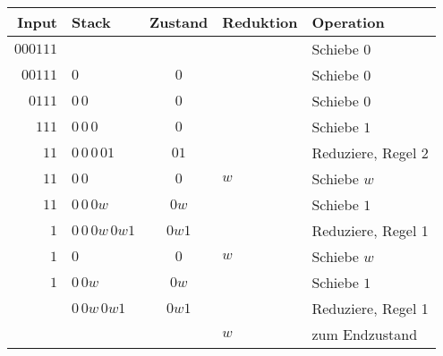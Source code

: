 \begin{center}
\begin{tabular}{|r|l|c|l|l|}
\hline
Input&Stack&Zustand&Reduktion&Operation\\
\hline
$000111$&&&&Schiebe $0$\\
$00111$&$\boxed{0}$&$\boxed{0}$&&Schiebe $0$\\
$0111$&$\boxed{0}\,\boxed{0}$&$\boxed{0}$&&Schiebe $0$\\
$111$&$\boxed{0}\,\boxed{0}\,\boxed{0}$&$\boxed{0}$&&Schiebe $1$\\
$11$&$\boxed{0}\,\boxed{0}\,\boxed{0}\,\boxed{01}$&$\boxed{01}$&&Reduziere, Regel 2\\
$11$&$\boxed{0}\,\boxed{0}$&$\boxed{0}$&$w$&Schiebe $w$\\
$11$&$\boxed{0}\,\boxed{0}\,\boxed{0w}$&$\boxed{0w}$&&Schiebe $1$\\
$1$&$\boxed{0}\,\boxed{0}\,\boxed{0w}\,\boxed{0w1}$&$\boxed{0w1}$&&Reduziere, Regel 1\\
$1$&$\boxed{0}$&$\boxed{0}$&$w$&Schiebe $w$\\
$1$&$\boxed{0}\,\boxed{0w}$&$\boxed{0w}$&&Schiebe $1$\\
&$\boxed{0}\,\boxed{0w}\,\boxed{0w1}$&$\boxed{0w1}$&&Reduziere, Regel 1\\
&&$\boxed{\phantom{0}}$&$w$&zum Endzustand\\
\hline
\end{tabular}
\end{center}

